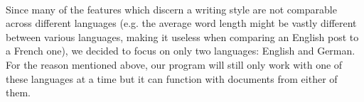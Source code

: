 \\
Since many of the features which discern a writing style are not comparable across different languages (e.g. the average word length might be vastly different between various languages, making it useless when comparing an English post to a French one), we decided to focus on only two languages: English and German.
For the reason mentioned above, our program will still only work with one of these languages at a time but it can function with documents from either of them.